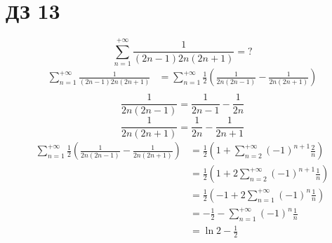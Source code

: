 \section*{ДЗ 13}

\begin{exercise}[2991]
    \[\sum_{n = 1}^{+\infty} \frac{1}{(2n - 1) 2n(2n + 1)} = ?\]
    \begin{align*}
        \sum_{n = 1}^{+\infty} \frac{1}{(2n - 1) 2n(2n + 1)}
         & = \sum_{n = 1}^{+\infty} \frac{1}{2}\left( \frac{1}{2n(2n - 1)} - \frac{1}{2n(2n + 1)} \right) \\
    \end{align*}
    \[\frac{1}{2n(2n - 1)} = \frac{1}{2n - 1} - \frac{1}{2n}\]
    \[\frac{1}{2n(2n + 1)} = \frac{1}{2n} - \frac{1}{2n + 1}\]
    \begin{align*}
        \sum_{n = 1}^{+\infty} \frac{1}{2}\left( \frac{1}{2n(2n - 1)} - \frac{1}{2n(2n + 1)} \right)
         & = \frac{1}{2}\left(1 + \sum_{n = 2}^{+\infty} ( - 1)^{n + 1} \frac{2}{n}\right)  \\
         & = \frac{1}{2}\left(1 + 2\sum_{n = 2}^{+\infty} ( - 1)^{n + 1} \frac{1}{n}\right) \\
         & = \frac{1}{2}\left( - 1 + 2\sum_{n = 1}^{+\infty} ( - 1)^{n} \frac{1}{n}\right)  \\
         & = - \frac{1}{2} - \sum_{n = 1}^{+\infty} ( - 1)^{n} \frac{1}{n}                  \\
         & = \ln 2 - \frac{1}{2}                                                            \\
    \end{align*}
\end{exercise}

\begin{exercise}[2998]

\end{exercise}

\begin{exercise}[3003]

\end{exercise}

\begin{exercise}[3007]

\end{exercise}

\begin{exercise}[3013]

\end{exercise}

\begin{exercise}[3015]

\end{exercise}

